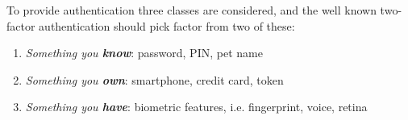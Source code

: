 To provide authentication three classes are considered, and the well known two-factor authentication should pick factor from two of these:
\begin{enumerate}
    \item \textit{Something you \textbf{know}}: password, PIN, pet name
    \item \textit{Something you \textbf{own}}: smartphone, credit card, token
    \item \textit{Something you \textbf{have}}: biometric features, i.e. fingerprint, voice, retina
\end{enumerate}

